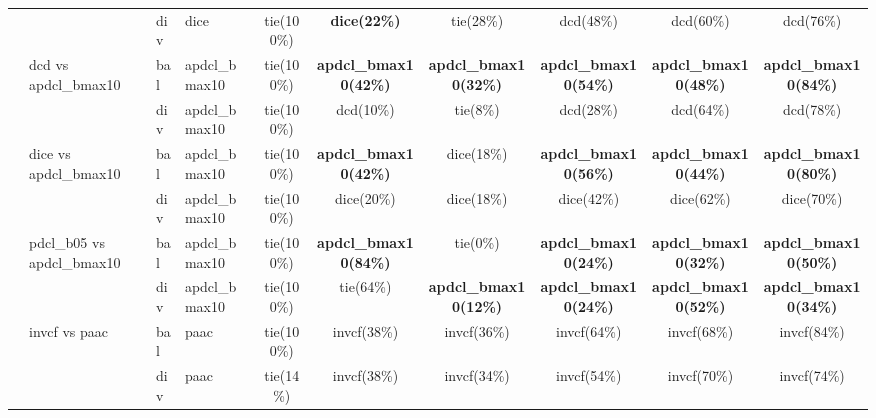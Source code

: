 \begin{table}[htbp]
{\begin{tabular}{llllcccccc}
 &  & div & dice & tie(100\%) & \textbf{dice(22\%)} & tie(28\%) & dcd(48\%) & dcd(60\%) & dcd(76\%) \\
 & dcd vs apdcl\_bmax10 & bal & apdcl\_bmax10 & tie(100\%) & \textbf{apdcl\_bmax10(42\%)} & \textbf{apdcl\_bmax10(32\%)} & \textbf{apdcl\_bmax10(54\%)} & \textbf{apdcl\_bmax10(48\%)} & \textbf{apdcl\_bmax10(84\%)} \\
 &  & div & apdcl\_bmax10 & tie(100\%) & dcd(10\%) & tie(8\%) & dcd(28\%) & dcd(64\%) & dcd(78\%) \\
 & dice vs apdcl\_bmax10 & bal & apdcl\_bmax10 & tie(100\%) & \textbf{apdcl\_bmax10(42\%)} & dice(18\%) & \textbf{apdcl\_bmax10(56\%)} & \textbf{apdcl\_bmax10(44\%)} & \textbf{apdcl\_bmax10(80\%)} \\
 &  & div & apdcl\_bmax10 & tie(100\%) & dice(20\%) & dice(18\%) & dice(42\%) & dice(62\%) & dice(70\%) \\
 & pdcl\_b05 vs apdcl\_bmax10 & bal & apdcl\_bmax10 & tie(100\%) & \textbf{apdcl\_bmax10(84\%)} & tie(0\%) & \textbf{apdcl\_bmax10(24\%)} & \textbf{apdcl\_bmax10(32\%)} & \textbf{apdcl\_bmax10(50\%)} \\
 &  & div & apdcl\_bmax10 & tie(100\%) & tie(64\%) & \textbf{apdcl\_bmax10(12\%)} & \textbf{apdcl\_bmax10(24\%)} & \textbf{apdcl\_bmax10(52\%)} & \textbf{apdcl\_bmax10(34\%)} \\
 & invcf vs paac & bal & paac & tie(100\%) & invcf(38\%) & invcf(36\%) & invcf(64\%) & invcf(68\%) & invcf(84\%) \\
 &  & div & paac & tie(14\%) & invcf(38\%) & invcf(34\%) & invcf(54\%) & invcf(70\%) & invcf(74\%) \\
\hline
\end{tabular}%
}
\end{table}

